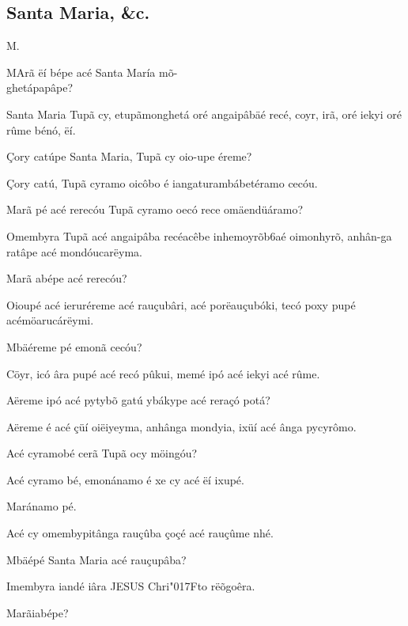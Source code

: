 \documentclass[openany,titlepage,12pt]{book}
\newcommand{\lgS}{\char"017F}
\newcommand{\comecalista}[5]{
    \hspace*{-11.7pt}
    \begin{minipage}[t]{0.08\linewidth}
        \flushright #1\\#2
    \end{minipage}
    \hspace{0pt}
    \begin{minipage}[t]{0.94\linewidth}
        \lettrine
        [findent =2pt, nindent=0pt,  lines=2]
        {#3}{#4}#5
    \end{minipage}
    \vspace*{-3pt}
}
\begin{document}
\subsection{Santa Maria, \&c.}
\unskip\vspace*{2pt}
\comecalista{M.}{}{M}{A}
    {rã ëí bépe acé Santa María mõ-\\
    ghetápapâpe?}
\begin{altereven}
    \item Santa Maria Tupã cy, etupãmonghetá\linebreak
    oré angaipâbäé recé, coyr, irã, oré iekyi\linebreak
    oré rûme bénó, ëí.
    \item Çory catúpe Santa Maria, Tupã cy oio-upe éreme?
    \item Çory catú, Tupã cyramo oicôbo é iangaturambábetéramo
    cecóu.
    \item Marã pé acé rerecóu Tupã cyramo oecó rece omäendüáramo?
    \item Omembyra Tupã acé angaipâba recé\linebreak acêbe 
    inhemoyrõb6aé oimonhyrõ, anhân-ga ratâpe acé mondóucarëyma.
    \item Marã abépe acé rerecóu?
    \item Oioupé acé ieruréreme acé rauçubâri,\linebreak
    acé porëauçubóki, tecó poxy pupé acé\linebreak möarucárëymi.
    \item Mbäéreme pé emonã cecóu?
    \item Cöyr, icó âra pupé acé recó pûkui, memé
    ipó acé iekyi acé rûme.
    \item Aëreme  ipó acé pytybõ gatú ybákype\linebreak
    acé reraçó potá?
    \item Aëreme é acé çüí oiëiyeyma, anhânga\linebreak
    mondyia, ixüí acé ânga pycyrômo.
    \item Acé cyramobé cerã Tupã ocy möingóu?
    \item Acé cyramo bé, emonánamo é xe cy acé ëí ixupé.
    \item Maránamo pé.
    \item Acé cy omembypitânga rauçûba çoçé acé rauçûme nhé. 
    \item Mbäépé Santa Maria acé rauçupâba?
    \item Imembyra iandé iâra JESUS Chri\lgS to rëõgoêra.
    \item Marãiabépe?

\end{altereven}
\end{document}
